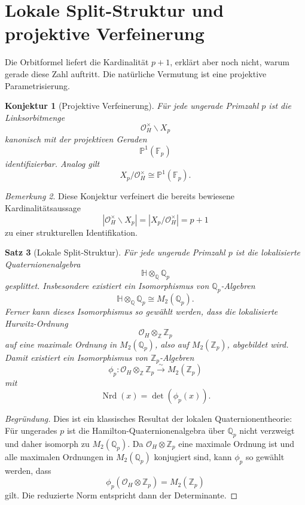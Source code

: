 \documentclass[12pt,a4paper]{article}
\theoremstyle{plain}
\newtheorem{satz}{Satz}[section]
\newtheorem{konjektur}[satz]{Konjektur}
\theoremstyle{definition}
\theoremstyle{remark}
\newtheorem{bemerkung}[satz]{Bemerkung}
\newcommand{\OH}{\mathcal O_H}
\newcommand{\QH}{\mathbb H}
\newcommand{\Z}{\mathbb Z}
\newcommand{\Q}{\mathbb Q}
\newcommand{\Fp}{\mathbb F_p}
\newcommand{\PP}{\mathbb P}
\newcommand{\nrd}{\operatorname{Nrd}}
\begin{document}
	\section{Lokale Split-Struktur und projektive Verfeinerung}
	
	Die Orbitformel liefert die Kardinalität \(p+1\), erklärt aber noch nicht, warum gerade diese Zahl auftritt. Die natürliche Vermutung ist eine projektive Parametrisierung.
	
	\begin{konjektur}[Projektive Verfeinerung]
		Für jede ungerade Primzahl \(p\) ist die Linksorbitmenge
		\[
		\OH^\times\backslash X_p
		\]
		kanonisch mit der projektiven Geraden
		\[
		\PP^1(\Fp)
		\]
		identifizierbar. Analog gilt
		\[
		X_p/\OH^\times \cong \PP^1(\Fp).
		\]
	\end{konjektur}
	
	\begin{bemerkung}
		Diese Konjektur verfeinert die bereits bewiesene Kardinalitätsaussage
		\[
		|\OH^\times\backslash X_p|=|X_p/\OH^\times|=p+1
		\]
		zu einer strukturellen Identifikation.
	\end{bemerkung}
	
	\begin{satz}[Lokale Split-Struktur]
		Für jede ungerade Primzahl \(p\) ist die lokalisierte Quaternionenalgebra
		\[
		\QH\otimes_{\Q}\Q_p
		\]
		gesplittet. Insbesondere existiert ein Isomorphismus von \(\Q_p\)-Algebren
		\[
		\QH\otimes_{\Q}\Q_p \cong M_2(\Q_p).
		\]
		Ferner kann dieses Isomorphismus so gewählt werden, dass die lokalisierte Hurwitz-Ordnung
		\[
		\OH\otimes_{\Z}\Z_p
		\]
		auf eine maximale Ordnung in \(M_2(\Q_p)\), also auf \(M_2(\Z_p)\), abgebildet wird. Damit existiert ein Isomorphismus von \(\Z_p\)-Algebren
		\[
		\phi_p:\OH\otimes_{\Z}\Z_p \xrightarrow{\sim} M_2(\Z_p)
		\]
		mit
		\[
		\nrd(x)=\det(\phi_p(x)).
		\]
	\end{satz}
	
	\begin{proof}[Begründung]
		Dies ist ein klassisches Resultat der lokalen Quaternionentheorie: Für ungerades \(p\) ist die Hamilton-Quaternionenalgebra über \(\Q_p\) nicht verzweigt und daher isomorph zu \(M_2(\Q_p)\). Da \(\OH\otimes\Z_p\) eine maximale Ordnung ist und alle maximalen Ordnungen in \(M_2(\Q_p)\) konjugiert sind, kann \(\phi_p\) so gewählt werden, dass
		\[
		\phi_p(\OH\otimes\Z_p)=M_2(\Z_p)
		\]
		gilt. Die reduzierte Norm entspricht dann der Determinante.
	\end{proof}
	
\end{document}

